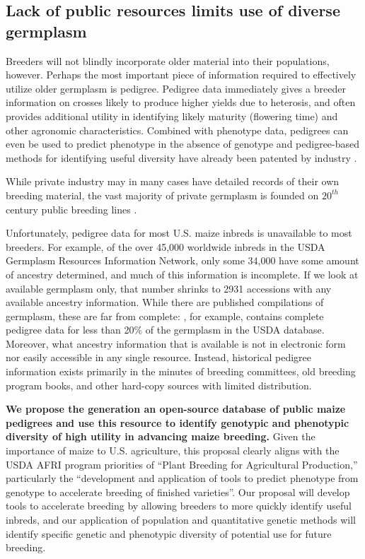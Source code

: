 \documentclass[12pt]{article}
\begin{document}
\subsection*{Lack of public resources limits use of diverse germplasm}

Breeders will not blindly incorporate older material into their populations, however.  
Perhaps the most important piece of information required to effectively utilize older germplasm is pedigree.
Pedigree data immediately gives a breeder information on crosses likely to produce higher yields due to heterosis, and often provides additional utility in identifying likely maturity (flowering time) and other agronomic characteristics. 
Combined with phenotype data, pedigrees can even be used to predict phenotype in the absence of genotype \citep{piepho2008blup} and pedigree-based methods for identifying useful diversity have already been patented by industry \citep{sebastian1995method}.

While private industry may in many cases have detailed records of their own breeding material, the vast majority of private germplasm is founded on $20^{th}$ century public breeding lines \citep{nelson2008molecular}.

Unfortunately, pedigree data for most U.S. maize inbreds is unavailable to most breeders. 
For example, of the over 45,000 worldwide inbreds in the USDA Germplasm Resources Information Network, only some 34,000 have some amount of ancestry determined, and much of this information is incomplete.
If we look at available germplasm only, that number shrinks to 2931 accessions with any available ancestry information.
While there are published compilations of germplasm, these are far from complete:  \citet{gerdes1993compilation}, for example, contains complete pedigree data for less than 20\% of the germplasm in the USDA database.
Moreover, what ancestry information that is available is not in electronic form nor easily accessible in any single resource.  
Instead, historical pedigree information exists primarily in the minutes of breeding committees, old breeding program books, and other hard-copy sources with limited distribution.  

\textbf{We propose the generation an open-source database of public maize pedigrees and use this resource to identify genotypic and phenotypic diversity of high utility in advancing maize breeding.}
Given the importance of maize to U.S. agriculture, this proposal clearly aligns with the USDA AFRI program priorities of ``Plant Breeding for Agricultural Production,'' particularly the ``development and application of tools to predict phenotype from genotype to accelerate breeding of finished varieties''.   
Our proposal will develop tools to accelerate breeding by allowing breeders to more quickly identify useful inbreds, and our application of population and quantitative genetic methods will identify specific genetic and phenotypic diversity of potential use for future breeding.  
\end{document}
